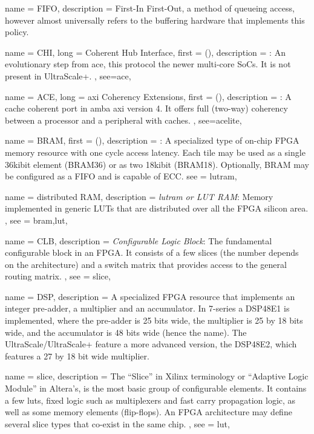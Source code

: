 {
	name = {FIFO},
	description = {
		First-In First-Out, a method of queueing access,
		however almost universally refers to the buffering hardware
		that implements this policy.
	}
}


{
	name = {CHI},
	long = {Coherent Hub Interface},
	first = { ()},
	description = {	\emph{}:
		An evolutionary step from \gls{ace}, this protocol the newer multi-core SoCs.
		It is not present in UltraScale+.
	},
	see={ace},
}

{
	name = {ACE},
	long = {\gls{axi} Coherency Extensions},
	first = { ()},
	description = {\emph{}:
		A cache coherent port in \gls{amba} \gls{axi} version 4. It offers full (two-way)
		coherency between a processor and a peripheral with caches.
	},
	see={acelite},
}

{
	name = {BRAM},
	first = { ()},
	description = {\emph{}:
		A specialized type of on-chip FPGA memory resource with one cycle access latency.
		Each tile may be used as a single 36kibit element (BRAM36) or as two 18kibit (BRAM18).
		Optionally, BRAM may be configured as a FIFO and is capable of ECC.
	}
	see = {lutram},
}

{
	name = {distributed RAM},
	description = {\emph{\Gls{lutram} or LUT RAM}:
		Memory implemented in generic LUTs that are distributed over all the FPGA silicon area.
	},
	see = {bram,lut},
}


{
	name = {CLB},
	description = {\emph{Configurable Logic Block}:
		The fundamental configurable block in an FPGA. It consists of a few \Glspl{slice}
		(the number depends on the architecture) and a switch matrix that provides
		access to the general routing matrix.
	},
	see = {slice},
}

{
	name = {DSP},
	description = {
		A specialized FPGA resource that implements an integer pre-adder,
		a multiplier and an accumulator. In 7-series a DSP48E1 is implemented,
		where the pre-adder is 25 bits wide, the multiplier is 25 by 18 bits wide,
		and the accumulator is 48 bits wide (hence the name). 
		The UltraScale/UltraScale+ feature a more advanced version, the DSP48E2,
		which features a 27 by 18 bit wide multiplier.
	}
}


{
	name = {slice},
	description = {
		The ``Slice'' in Xilinx terminology or ``Adaptive Logic Module'' in Altera's,
		is the most basic group of configurable elements. It contains a few \glspl{lut},
		fixed logic such as multiplexers and fast carry propagation logic, as well as
		some memory elements (flip-flops). An FPGA architecture may define several slice types
		that co-exist in the same chip.
	},
	see = {lut},
}


